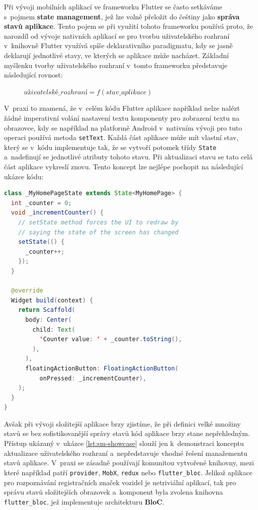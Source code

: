 \documentclass[12pt, a4paper]{article}
\begin{document}
Při vývoji mobilních aplikací ve frameworku Flutter se často setkáváme s~pojmem \textbf{state management}, jež lze volně přeložit do češtiny jako \textbf{správa stavů aplikace}. Tento pojem se při využití tohoto frameworku používá proto, že narozdíl od vývoje nativních aplikací se pro tvorbu uživatelského rozhraní v~knihovně Flutter využívá spíše deklarativního paradigmatu, kdy se jasně deklarují jednotlivé stavy, ve kterých se aplikace může nacházet. Základní myšlenku tvorby uživatelského rozhraní v~tomto frameworku představuje následující rovnost:

\begin{figure}[!ht]
\center
$
uživatelské\_rozhraní = f(stav\_aplikace)
$
\end{figure}

V~praxi to znamená, že v~celém kódu Flutter aplikace například nelze nalézt žádné imperativní volání nastavení textu komponenty pro zobrazení textu na obrazovce, kdy se například na platformě Android v~nativním vývoji pro tuto operaci používá metoda \texttt{setText}. Každá část aplikace může mít vlastní stav, který se v~kódu implementuje tak, že se vytvoří potomek třídy \texttt{State} a~nadefinují se jednotlivé atributy tohoto stavu. Při aktualizaci stavu se tato celá část aplikace vykreslí znovu. Tento koncept lze nejlépe pochopit na následující ukázce kódu:

\begin{lstlisting}[language=Java,caption={Jednoduchá demonstrace aktualizace uživatelského rozhraní ve frameworku Flutter},captionpos=b, label={lst:sm-showcase}]
class _MyHomePageState extends State<MyHomePage> {
  int _counter = 0;
  void _incrementCounter() {
    // setState method forces the UI to redraw by
    // saying the state of the screen has changed
    setState(() {
      _counter++;
    });
  }

  @override
  Widget build(context) {
    return Scaffold(
      body: Center(
        child: Text(
          'Counter value: ' + _counter.toString(),
        ),
      ),
      floatingActionButton: FloatingActionButton(
          onPressed: _incrementCounter),
    );
  }
}
\end{lstlisting}

Avšak při vývoji složitejší aplikace brzy zjistíme, že při definici velké množiny stavů se bez sofistikovanější správy stavů kód aplikace brzy stane nepřehledným. Přístup ukázaný v~ukázce \ref{lst:sm-showcase} slouží jen k~demonstraci konceptu aktualizace uživatelského rozhraní a~nepředstavuje vhodné řešení manažementu stavů aplikace. V~praxi se zásadně používají komunitou vytvořené knihovny, mezi které například patří \texttt{provider}, \texttt{MobX}, \texttt{redux} nebo \texttt{flutter\_bloc}. Jelikož aplikace pro rozpoznávání registračních značek vozidel je netriviální aplikací, tak pro správu stavů složitejších obrazovek a~komponent byla zvolena knihovna \texttt{flutter\_bloc}, jež implementuje architekturu \textbf{BloC}.
\end{document}
